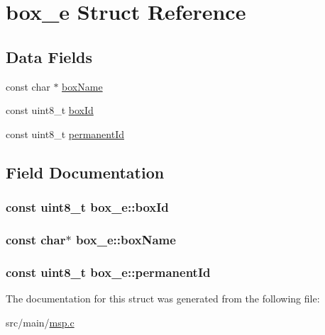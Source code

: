 \hypertarget{structbox__e}{\section{box\+\_\+e Struct Reference}
\label{structbox__e}
}
\subsection*{Data Fields}
\begin{DoxyCompactItemize}
\item 
const char $\ast$ \hyperlink{structbox__e_a40bd8ecf55d1b8ab8df9044d5d88aebb}{box\+Name}
\item 
const uint8\+\_\+t \hyperlink{structbox__e_a72daa2254bfca1186f6ab9be5e1e0a2b}{box\+Id}
\item 
const uint8\+\_\+t \hyperlink{structbox__e_a53e8e844ddef190054b2217293fa01e5}{permanent\+Id}
\end{DoxyCompactItemize}


\subsection{Field Documentation}
\hypertarget{structbox__e_a72daa2254bfca1186f6ab9be5e1e0a2b}{
\subsubsection[{box\+Id}]{\setlength{\rightskip}{0pt plus 5cm}const uint8\+\_\+t box\+\_\+e\+::box\+Id}}\label{structbox__e_a72daa2254bfca1186f6ab9be5e1e0a2b}
\hypertarget{structbox__e_a40bd8ecf55d1b8ab8df9044d5d88aebb}{
\subsubsection[{box\+Name}]{\setlength{\rightskip}{0pt plus 5cm}const char$\ast$ box\+\_\+e\+::box\+Name}}\label{structbox__e_a40bd8ecf55d1b8ab8df9044d5d88aebb}
\hypertarget{structbox__e_a53e8e844ddef190054b2217293fa01e5}{
\subsubsection[{permanent\+Id}]{\setlength{\rightskip}{0pt plus 5cm}const uint8\+\_\+t box\+\_\+e\+::permanent\+Id}}\label{structbox__e_a53e8e844ddef190054b2217293fa01e5}


The documentation for this struct was generated from the following file\+:\begin{DoxyCompactItemize}
\item 
src/main/\hyperlink{msp_8c}{msp.\+c}\end{DoxyCompactItemize}
